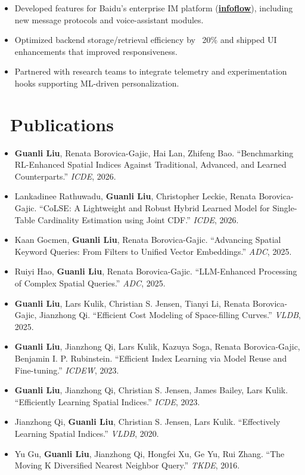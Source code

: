 \documentclass{resume}
\begin{document}
\begin{itemize}[parsep=0.35ex]
  \item Developed features for Baidu’s enterprise IM platform (\href{https://infoflow.baidu.com/}{\textbf{infoflow}}), including new message protocols and voice-assistant modules.
  \item Optimized backend storage/retrieval efficiency by ~20\% and shipped UI enhancements that improved responsiveness.
  \item Partnered with research teams to integrate telemetry and experimentation hooks supporting ML-driven personalization.
\end{itemize}

\section{\faFile\ \textbf{Publications}}
\begin{itemize}[parsep=0.35ex]
  \item \textbf{Guanli Liu}, Renata Borovica-Gajic, Hai Lan, Zhifeng Bao. ``Benchmarking RL-Enhanced Spatial Indices Against Traditional, Advanced, and Learned Counterparts.'' \textit{ICDE}, 2026.
  \item Lankadinee Rathuwadu, \textbf{Guanli Liu}, Christopher Leckie, Renata Borovica-Gajic. ``CoLSE: A Lightweight and Robust Hybrid Learned Model for Single-Table Cardinality Estimation using Joint CDF.'' \textit{ICDE}, 2026.
  \item Kaan Gocmen, \textbf{Guanli Liu}, Renata Borovica-Gajic. ``Advancing Spatial Keyword Queries: From Filters to Unified Vector Embeddings.'' \textit{ADC}, 2025.
  \item Ruiyi Hao, \textbf{Guanli Liu}, Renata Borovica-Gajic. ``LLM-Enhanced Processing of Complex Spatial Queries.'' \textit{ADC}, 2025.
  \item \textbf{Guanli Liu}, Lars Kulik, Christian S. Jensen, Tianyi Li, Renata Borovica-Gajic, Jianzhong Qi. ``Efficient Cost Modeling of Space-filling Curves.'' \textit{VLDB}, 2025.
  \item \textbf{Guanli Liu}, Jianzhong Qi, Lars Kulik, Kazuya Soga, Renata Borovica-Gajic, Benjamin I. P. Rubinstein. ``Efficient Index Learning via Model Reuse and Fine-tuning.'' \textit{ICDEW}, 2023.
  \item \textbf{Guanli Liu}, Jianzhong Qi, Christian S. Jensen, James Bailey, Lars Kulik. ``Efficiently Learning Spatial Indices.'' \textit{ICDE}, 2023.
  \item Jianzhong Qi, \textbf{Guanli Liu}, Christian S. Jensen, Lars Kulik. ``Effectively Learning Spatial Indices.'' \textit{VLDB}, 2020.
  \item Yu Gu, \textbf{Guanli Liu}, Jianzhong Qi, Hongfei Xu, Ge Yu, Rui Zhang. ``The Moving K Diversified Nearest Neighbor Query.'' \textit{TKDE}, 2016.
\end{itemize}
\end{document}
